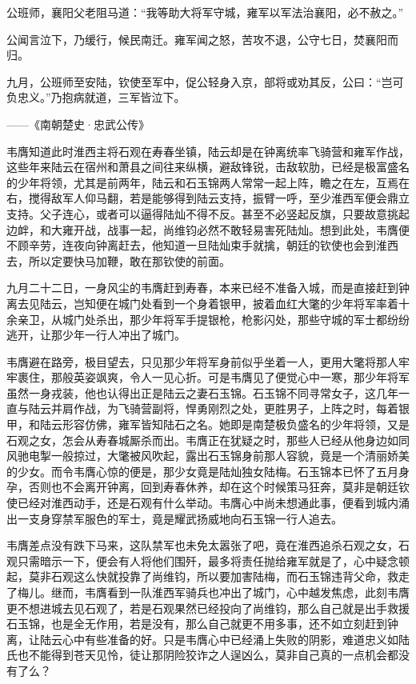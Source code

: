 公班师，襄阳父老阻马道：“我等助大将军守城，雍军以军法治襄阳，必不赦之。”

公闻言泣下，乃缓行，候民南迁。雍军闻之怒，苦攻不退，公守七日，焚襄阳而归。

九月，公班师至安陆，钦使至军中，促公轻身入京，部将或劝其反，公曰：“岂可负忠义。”乃抱病就道，三军皆泣下。

——《南朝楚史·忠武公传》

韦膺知道此时淮西主将石观在寿春坐镇，陆云却是在钟离统率飞骑营和雍军作战，这些年来陆云在宿州和萧县之间往来纵横，避敌锋锐，击敌软肋，已经是极富盛名的少年将领，尤其是前两年，陆云和石玉锦两人常常一起上阵，瞻之在左，互焉在右，搅得敌军人仰马翻，若是能够得到陆云支持，振臂一呼，至少淮西军便会鼎立支持。父子连心，或者可以逼得陆灿不得不反。甚至不必竖起反旗，只要故意挑起边衅，和大雍开战，战事一起，尚维钧必然不敢轻易害死陆灿。想到此处，韦膺便不顾辛劳，连夜向钟离赶去，他知道一旦陆灿束手就擒，朝廷的钦使也会到淮西去，所以定要快马加鞭，敢在那钦使的前面。

九月二十二日，一身风尘的韦膺赶到寿春，本来已经不准备入城，而是直接赶到钟离去见陆云，岂知便在城门处看到一个身着银甲，披着血红大氅的少年将军率着十余亲卫，从城门处杀出，那少年将军手提银枪，枪影闪处，那些守城的军士都纷纷逃开，让那少年一行人冲出了城门。

韦膺避在路旁，极目望去，只见那少年将军身前似乎坐着一人，更用大氅将那人牢牢裹住，那般英姿飒爽，令人一见心折。可是韦膺见了便觉心中一寒，那少年将军虽然一身戎装，他也认得出正是陆云之妻石玉锦。石玉锦不同寻常女子，这几年一直与陆云并肩作战，为飞骑营副将，悍勇刚烈之处，更胜男子，上阵之时，每着银甲，和陆云形容仿佛，雍军皆知陆石之名。她即是南楚极负盛名的少年将领，又是石观之女，怎会从寿春城厮杀而出。韦膺正在犹疑之时，那些人已经从他身边如同风驰电掣一般掠过，大氅被风吹起，露出石玉锦身前那人容貌，竟是一个清丽娇美的少女。而令韦膺心惊的便是，那少女竟是陆灿独女陆梅。石玉锦本已怀了五月身孕，否则也不会离开钟离，回到寿春休养，却在这个时候策马狂奔，莫非是朝廷钦使已经对淮西动手，还是石观有什么举动。韦膺心中尚未想通此事，便看到城内涌出一支身穿禁军服色的军士，竟是耀武扬威地向石玉锦一行人追去。

韦膺差点没有跌下马来，这队禁军也未免太嚣张了吧，竟在淮西追杀石观之女，石观只需暗示一下，便会有人将他们围歼，最多将责任抛给雍军就是了，心中疑念顿起，莫非石观这么快就投靠了尚维钧，所以要加害陆梅，而石玉锦违背父命，救走了梅儿。继而，韦膺看到一队淮西军骑兵也冲出了城门，心中越发焦虑，此刻韦膺更不想进城去见石观了，若是石观果然已经投向了尚维钧，那么自己就是出手救援石玉锦，也是全无作用，若是没有，那么自己就更不用多事，还不如立刻赶到钟离，让陆云心中有些准备的好。只是韦膺心中已经涌上失败的阴影，难道忠义如陆氏也不能得到苍天见怜，徒让那阴险狡诈之人逞凶么，莫非自己真的一点机会都没有了么？

